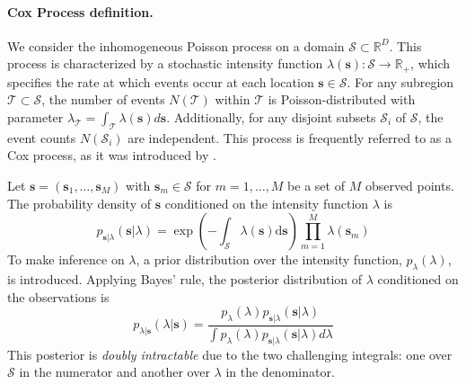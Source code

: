 \paragraph{Cox Process definition.}
We consider the inhomogeneous Poisson process on a domain $\mathcal{S}\subset\mathbb{R}^{D}$. This process is characterized by a stochastic intensity function $\lambda(\boldsymbol{s}):\mathcal{S}\to\mathbb{R}_{+}$, which specifies the rate at which events occur at each location $\boldsymbol{s}\in\mathcal{S}$. For any subregion $\mathcal{T}\subset\mathcal{S}$, the number of events $N(\mathcal{T})$ within $\mathcal{T}$ is Poisson-distributed with parameter $\lambda_{\mathcal{T}} = \int_{\mathcal{T}} \lambda(\boldsymbol{s})d\boldsymbol{s}$. Additionally, for any disjoint subsets $\mathcal{S}_{i}$ of $\mathcal{S}$, the event counts $N(\mathcal{S}_{i})$ are independent. This process is frequently referred to as a Cox process, as it was introduced by \citet{cox_process}.

Let $\mathbf{s} =(\boldsymbol{s}_{1},\ldots,\boldsymbol{s}_{M})$ with $\boldsymbol{s}_{m}\in \mathcal{S}$ for $m=1,\ldots,M$ be  a set of $M$ observed points. The probability density of $\mathbf{s}$ conditioned on the intensity function $\lambda$ is 
\begin{equation*}
    p_{\mathbf{s}\vert \lambda}(\mathbf{s}| \lambda) = \exp\left(-\int_{\mathcal{S}} \lambda(\boldsymbol{s})\mathrm{d}\boldsymbol{s}\right)\prod_{m=1}^{M}\lambda(\boldsymbol{s}_{m})
\end{equation*}
To make inference on $\lambda$, a prior distribution over the intensity function, $p_{\lambda}(\lambda)$, is introduced. Applying Bayes’ rule, the posterior distribution of $\lambda$ conditioned on the observations is
\begin{equation*}
    p_{\lambda\vert\mathbf{s}}(\lambda | \mathbf{s}) = \frac{p_{\lambda}(\lambda)p_{\mathbf{s}\vert \lambda}(\mathbf{s}| \lambda)}{\int p_{\lambda}(\lambda)p_{\mathbf{s}\vert \lambda}(\mathbf{s}| \lambda) d\lambda}
\end{equation*}
This posterior is \textit{doubly intractable} due to the two challenging integrals: one over $\mathcal{S}$ in the numerator and another over $\lambda$ in the denominator.

